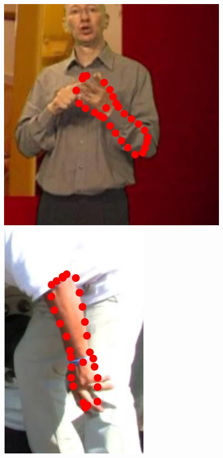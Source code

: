 \begin{figure}
    \includegraphics[height=\ofh]{resources/Annotation_Correction/Suplementory_Meterial/ExFit/0011}
    \hfill
    \includegraphics[height=\ofh]{resources/Annotation_Correction/Suplementory_Meterial/ExFit/0012}
    \hfill

\end{figure}
